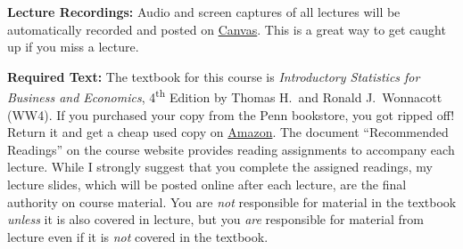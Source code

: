\documentclass[11pt, letterpaper]{article}
\begin{document}
\medskip

\noindent \textbf{Lecture Recordings: } 
Audio and screen captures of all lectures will be automatically recorded and posted on \href{http://upenn.instructure.com}{Canvas}. 
This is a great way to get caught up if you miss a lecture.

\medskip

\noindent \textbf{Required Text:} 
The textbook for this course is \emph{Introductory Statistics for Business and Economics}, 4\textsuperscript{th} Edition by Thomas H.\ and Ronald J.\ Wonnacott (WW4). 
If you purchased your copy from the Penn bookstore, you got ripped off! Return it and get a cheap used copy on \href{http://tinyurl.com/ECON103-2013A}{Amazon}.
The document ``Recommended Readings'' on the course website provides reading assignments to accompany each lecture.
While I strongly suggest that you complete the assigned readings, my lecture slides, which will be posted online after each lecture, are the final authority on course material. 
You are \emph{not} responsible for material in the textbook \emph{unless} it is also covered in lecture, but you \emph{are} responsible for material from lecture even if it is \emph{not} covered in the textbook.

\medskip


%
\end{document}

